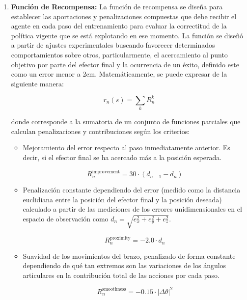 \begin{enumerate}
	\item \textbf{Función de Recompensa: } La función de recompensa se diseña para establecer las aportaciones y penalizaciones compuestas que debe recibir el agente en cada paso del entrenamiento para evaluar la correctitud de la política vigente que se está explotando en ese momento. La función se diseñó a partir de ajustes experimentales buscando favorecer determinados comportamientos sobre otros, particularmente, el acercamiento al punto objetivo por parte del efector final y la ocurrencia de un éxito, definido este como un error menor a 2cm. Matemáticamente, se puede expresar de la siguiente manera:
	
	\begin{equation}
		r_n(s) = \sum_{k} R_n^{k}
	\end{equation}
	
	donde corresponde a la sumatoria de un conjunto de funciones parciales que calculan penalizaciones y contribuciones según los criterios:
	\begin{itemize}
		\item Mejoramiento del error respecto al paso inmediatamente anterior. Es decir, si el efector final se ha acercado más a la posición esperada.
		
		\begin{equation}
			R_{n}^{\text{improvement}} = 30 \cdot (d_{n-1} - d_{n})
		\end{equation}
		
		\item Penalización constante dependiendo del error (medido como la distancia euclidiana entre la posición del efector final y la posición deseada) calculado a partir de las mediciones de los errores unidimensionales en el espacio de observación como $d_n = \sqrt{e_x^2 + e_y^2 + e_z^2}$.
		
		\begin{equation}
			R_{n}^{\text{proximity}} = -2.0 \cdot d_n
		\end{equation}
		
		\item Suavidad de los movimientos del brazo, penalizado de forma constante dependiendo de qué tan extremos son las variaciones de los ángulos articulares en la contribución total de las acciones por cada paso.
		
		\begin{equation}
			R_{n}^{\text{smoothness}} = -0.15 \cdot \left|\Delta\theta\right|^2
		\end{equation}
		

\end{itemize}
\end{enumerate}
